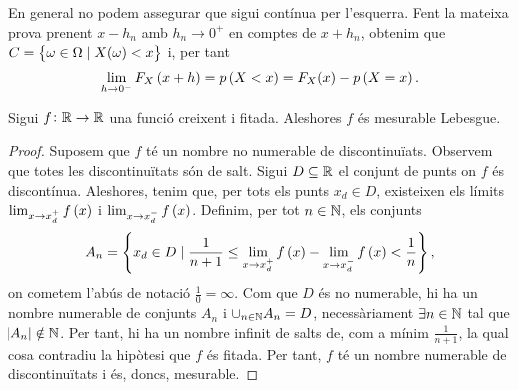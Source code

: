 \begin{obs}
  En general no podem assegurar que sigui contínua per l'esquerra. Fent la mateixa prova prenent $x-h_n$ amb $h_n\to 0^+$ en comptes de $x+h_n$, obtenim que
  $C=\left\{ \omega\in\Omega\mid X(\omega)<x\right\}$ i, per tant
  \[
   \lim\limits_{h\to 0^-} F_X\left( x+h\right) = p\left( X<x\right) = F_X(x)-p\left( X=x\right).
  \]
\end{obs}

\begin{lema}
 Sigui $f\colon \mathbb{R} \to \mathbb{R}$ una funció creixent i fitada. Aleshores $f$ és mesurable Lebesgue.
\end{lema}
\begin{proof}
    Suposem que $f$ té un nombre no numerable de discontinuïats. Observem que totes les discontinuïtats són de salt. Sigui $D\subseteq \mathbb{R}$ el conjunt de punts on $f$ és discontínua. Aleshores, tenim que, per tots els punts $x_d\in D$, existeixen els límits $\lim_{x\to x_d^+}f\left( x\right)$ i $\lim_{x\to x_d^-}f\left( x\right)$. Definim, per tot $n\in\mathbb{N}$, els conjunts
    \[
        A_n=\left\{ x_d\in D\mid \frac{1}{n+1}\leq\lim_{x\to x_d^+}f\left( x\right)-\lim_{x\to x_d^-}f\left( x\right)<\frac{1}{n}\right\},
    \]
    on cometem l'abús de notació $\frac{1}{0}=\infty$. Com que $D$ és no numerable, hi ha un nombre numerable de conjunts $A_n$ i $\cup_{n\in\mathbb{N}}A_n=D$, necessàriament $\exists n\in\mathbb{N}$ tal que $\abs{A_n}\notin\mathbb{N}$. Per tant, hi ha un nombre infinit de salts de, com a mínim $\frac{1}{n+1}$, la qual cosa contradiu la hipòtesi que $f$ és fitada. Per tant, $f$ té un nombre numerable de discontinuïtats i és, doncs, mesurable.
\end{proof}

